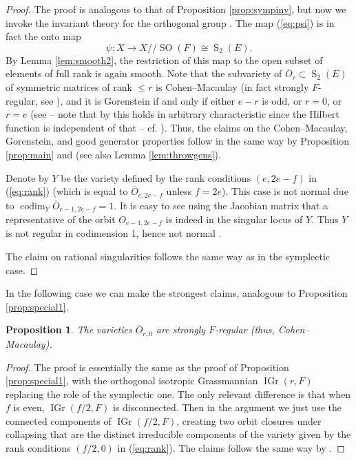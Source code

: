 \documentclass[11pt]{amsart}
\numberwithin{equation}{section}
\newtheorem{proposition}[equation]{Proposition}
\theoremstyle{definition}
\DeclareMathOperator{\codim}{codim}
\DeclareMathOperator{\SO}{SO}
\newcommand{\op}{\operatorname}
\newcommand{\ol}{\overline}
\begin{document}
\begin{proof}
The proof is analogous to that of Proposition \ref{prop:sympinv}, but now we invoke the invariant theory for the orthogonal group \cite{deconproc}. The map (\ref{eq:psi}) is in fact the onto map
\[\psi: X \longrightarrow  X/\!\!/\SO(F) \cong \op{S}_2(E).\] 
By Lemma \ref{lem:smooth2}, the restriction of this map to the open subset of elements of full rank is again smooth. Note that the subvariety of $\ol{O}_r \subset \op{S}_2(E)$ of symmetric matrices of rank $\leq r$ is Cohen--Macaulay \cite{kutz} (in fact strongly $F$-regular, see \cite[Section 4.1]{me}), and it is Gorenstein if and only if either $e-r$ is odd, or $r=0$, or $r=e$ (see \cite[Corollary 6.3.7]{weymanbook} -- note that by \cite[Theorem 4.4]{stanley} this holds in arbitrary characteristic since the Hilbert function is independent of that -- cf. \cite[Proposition 6.1.1]{weymanbook}).  Thus, the claims on the Cohen--Macaulay, Gorenstein, and good generator properties follow in the same way by Proposition \ref{prop:main} and  \cite[Section 4.1]{me} (see also Lemma \ref{lem:throwgens}). 

Denote by $Y$ be the variety defined by the rank conditions $(e,2e -f)$ in (\ref{eq:rank}) (which is equal to $\ol{O}_{e, 2e-f}$ unless $f=2e$). This case is not normal due to $\codim_{Y} \ol{O}_{e-1, 2e-f}=1$. It is easy to see using the Jacobian matrix \cite[Section 5]{hartshorne} that a representative of the orbit $O_{e-1, 2e-f}$ is indeed in the singular locus of $Y$. Thus $Y$ is not regular in codimension 1, hence not normal \cite[Theorem 8.22A]{hartshorne}.

The claim on rational singularities follows the same way as in the symplectic case.
\end{proof}


In the following case we can make the strongest claims, analogous to Proposition \ref{prop:special1}.

\begin{proposition}\label{prop:special2}
The varieties $\ol{O}_{r,0}$ are strongly $F$-regular (thus, Cohen--Macaulay).
\end{proposition}

\begin{proof}
The proof is essentially the same as the proof of Proposition \ref{prop:special1}, with the orthogonal isotropic Grassmannian $\op{IGr}(r,F)$ replacing the role of the symplectic one. The only relevant difference is that when $f$ is even, $\op{IGr}(f/2,F)$ is disconnected. Then in the argument we just use the connected components of $\op{IGr}(f/2,F)$, creating two orbit closures under collapsing that are the distinct irreducible components of the variety given by the rank conditions $(f/2,0)$ in (\ref{eq:rank}). The claims follow the same way by \cite[Theorem 1.2]{me}.
\end{proof}
\end{document}
